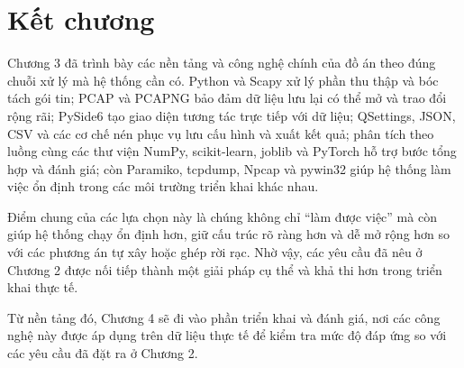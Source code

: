 \documentclass[../DoAn.tex]{subfiles}
\begin{document}
\section{Kết chương}
Chương 3 đã trình bày các nền tảng và công nghệ chính của đồ án theo đúng chuỗi xử lý mà hệ thống cần có. Python và Scapy xử lý phần thu thập và bóc tách gói tin; PCAP và PCAPNG bảo đảm dữ liệu lưu lại có thể mở và trao đổi rộng rãi; PySide6 tạo giao diện tương tác trực tiếp với dữ liệu; QSettings, JSON, CSV và các cơ chế nén phục vụ lưu cấu hình và xuất kết quả; phân tích theo luồng cùng các thư viện NumPy, scikit-learn, joblib và PyTorch hỗ trợ bước tổng hợp và đánh giá; còn Paramiko, tcpdump, Npcap và pywin32 giúp hệ thống làm việc ổn định trong các môi trường triển khai khác nhau.

Điểm chung của các lựa chọn này là chúng không chỉ “làm được việc” mà còn giúp hệ thống chạy ổn định hơn, giữ cấu trúc rõ ràng hơn và dễ mở rộng hơn so với các phương án tự xây hoặc ghép rời rạc. Nhờ vậy, các yêu cầu đã nêu ở Chương 2 được nối tiếp thành một giải pháp cụ thể và khả thi hơn trong triển khai thực tế.

Từ nền tảng đó, Chương 4 sẽ đi vào phần triển khai và đánh giá, nơi các công nghệ này được áp dụng trên dữ liệu thực tế để kiểm tra mức độ đáp ứng so với các yêu cầu đã đặt ra ở Chương 2.
\end{document}

